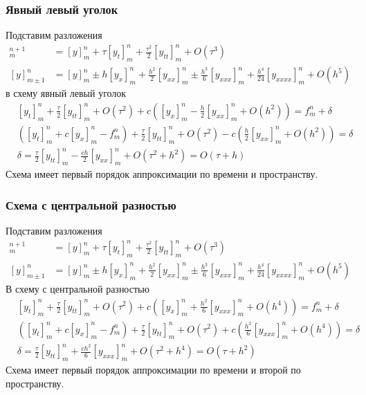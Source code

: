 \documentclass[professionalfonts,compress,unicode,aspectratio=169]{beamer}
\begin{document}
\begin{frame}\frametitle{Явный левый уголок}
	Подставим разложения
	\begin{align*}
	[y]^{n+1}_m &= [y]^n_m + \tau [y_t]_m^n + \frac{\tau^2}{2} [y_{tt}]_m^n + O(\tau^3)\\
	[y]^n_{m \pm 1} &= [y]^n_m \pm h[y_x]_m^n + \frac{h^2}{2} [y_{xx}]_m^n \pm \frac{h^3}{6} [y_{xxx}]_m^n + \frac{h^4}{24} [y_{xxxx}]_m^n + O(h^5)
	\end{align*}
	в схему явный левый уголок
	\begin{align*}
	&[y_t]_m^n + \frac{\tau}{2} [y_{tt}]_m^n + O(\tau^2) + c\left([y_x]_m^n - \frac{h}{2} [y_{xx}]_m^n + O(h^2)\right) = f^n_m + \delta\\
	&([y_t]_m^n+c[y_x]_m^n-f_m^n) + \frac{\tau}{2} [y_{tt}]_m^n + O(\tau^2) - c\left(\frac{h}{2} [y_{xx}]_m^n + O(h^2)\right) = \delta\\
	&\delta = \frac{\tau}{2}[y_{tt}]_m^n - \frac{ch}{2}[y_{xx}]_m^n + O(\tau^2+h^2) = O(\tau+h)
	\end{align*}
	Схема имеет первый порядок аппроксимации по времени и пространству.
\end{frame}

\begin{frame}\frametitle{Схема с центральной разностью}
	Подставим разложения
	\begin{align*}
	[y]^{n+1}_m &= [y]^n_m + \tau [y_t]_m^n + \frac{\tau^2}{2} [y_{tt}]_m^n + O(\tau^3)\\
	[y]^n_{m \pm 1} &= [y]^n_m \pm h[y_x]_m^n + \frac{h^2}{2} [y_{xx}]_m^n \pm \frac{h^3}{6} [y_{xxx}]_m^n + \frac{h^4}{24} [y_{xxxx}]_m^n + O(h^5)
	\end{align*}
	В схему с центральной разностью
	\begin{align*}
	&[y_t]_m^n + \frac{\tau}{2} [y_{tt}]_m^n + O(\tau^2) + c\left([y_x]_m^n + \frac{h^2}{6} [y_{xxx}]_m^n + O(h^4)\right) = f^n_m + \delta\\
	&([y_t]_m^n+c[y_x]_m^n-f_m^n) + \frac{\tau}{2} [y_{tt}]_m^n + O(\tau^2) + c\left(\frac{h^2}{6} [y_{xxx}]_m^n + O(h^4)\right) = \delta\\
	&\delta = \frac{\tau}{2}[y_{tt}]_m^n + \frac{ch^2}{6}[y_{xxx}]_m^n + O(\tau^2+h^4) = O(\tau+h^2)
	\end{align*}
	Схема имеет первый порядок аппроксимации по времени и второй по
пространству.
\end{frame}
\end{document}

